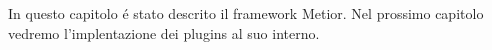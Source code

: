 In questo capitolo \'e stato descrito il framework Metior. Nel prossimo capitolo vedremo l'implentazione
dei plugins al suo interno.
